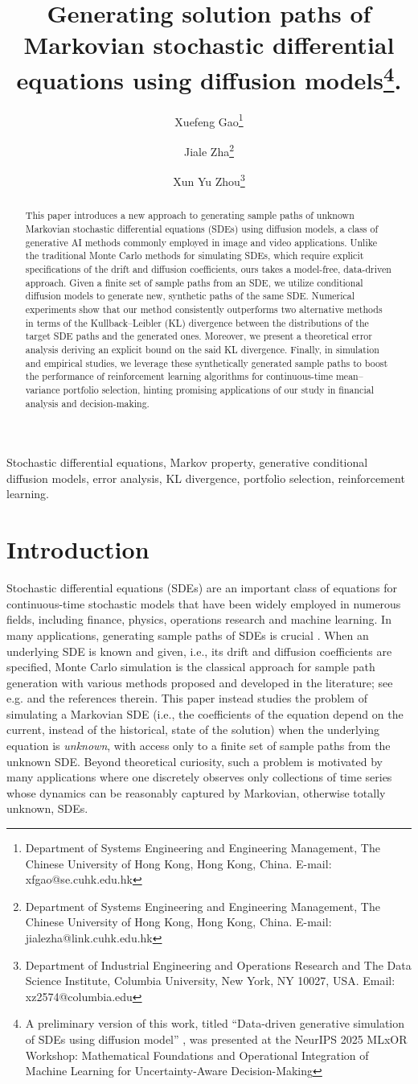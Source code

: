 \documentclass[11pt]{article}
\title{Generating solution paths of Markovian stochastic differential equations using diffusion models\footnote{A preliminary version of this work, titled ``Data-driven generative simulation of SDEs using diffusion model'' \citep{gao2025datadriven}, was presented at the NeurIPS 2025 MLxOR Workshop: Mathematical
Foundations and Operational Integration of Machine Learning for Uncertainty-Aware Decision-Making}.}
\author{
	Xuefeng Gao\thanks{Department of Systems Engineering and Engineering Management, The Chinese University of Hong Kong, Hong Kong, China. E-mail: xfgao@se.cuhk.edu.hk}
	\and
	Jiale Zha\thanks{Department of Systems Engineering and Engineering Management, The Chinese University of Hong Kong, Hong Kong, China. E-mail: jialezha@link.cuhk.edu.hk }
	\and
	Xun Yu Zhou\thanks{Department of Industrial Engineering and Operations Research and The Data Science Institute, Columbia University, New York, NY 10027, USA. Email: xz2574@columbia.edu}
}
\begin{document}
\maketitle


\begin{abstract}
   This paper introduces a new approach to generating sample paths of unknown Markovian stochastic differential equations (SDEs) using diffusion models, a class of generative AI methods commonly employed in image and video applications. Unlike the traditional Monte Carlo methods for simulating SDEs, which require explicit specifications of the drift and diffusion coefficients, ours takes a model-free, data-driven approach. Given a finite set of sample paths from an SDE, we utilize conditional diffusion models to generate new, synthetic paths of the same SDE. Numerical experiments show that our method consistently outperforms two alternative methods in terms of the Kullback--Leibler (KL) divergence between the distributions of the target SDE paths and the generated ones. Moreover, we present a theoretical error analysis deriving an explicit bound on the said KL  divergence.
    Finally, in simulation and empirical studies,  we leverage these synthetically generated sample paths to boost the performance of reinforcement learning algorithms for continuous-time mean--variance portfolio selection, hinting promising applications of our study in financial analysis and decision-making.
\end{abstract}


 Stochastic differential equations, Markov property, generative conditional diffusion models,
error analysis, KL divergence, portfolio selection, reinforcement learning.

\section{Introduction}



Stochastic differential equations (SDEs) are an important class of equations for continuous-time stochastic models that have been widely employed in numerous fields, including finance, physics, operations research and machine learning. In many applications, generating sample paths of SDEs is crucial \citep{glasserman2004monte, kloedennumerical, songscore}. When an underlying SDE is known and given, i.e., its drift and diffusion coefficients are specified, Monte Carlo simulation is the classical approach for sample path generation with various methods proposed and developed in the literature; see e.g.  \cite{kloedennumerical} and the references therein. This paper instead studies the problem of simulating a Markovian SDE (i.e., the coefficients of the equation depend on the current, instead of the historical, state of the solution) when the underlying equation is {\it unknown}, with access only to a finite set of sample paths from the unknown SDE. Beyond theoretical curiosity, such a problem is motivated by many applications where one discretely observes only collections of time series whose dynamics can be reasonably captured by Markovian, otherwise totally unknown, SDEs.
\end{document}
